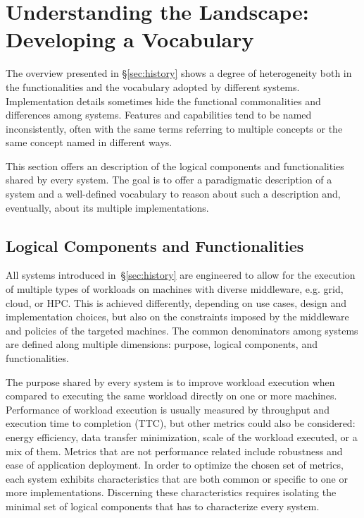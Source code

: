 \documentclass{sig-alternate}
\begin{document}
\section{Understanding the Landscape: Developing a Vocabulary}
\label{sec:understanding}

The overview presented in \S\ref{sec:history} shows a degree of heterogeneity
both in the functionalities and the vocabulary adopted by different \pilotjob
systems. Implementation details sometimes hide the functional commonalities and
differences among \pilotjob systems. Features and capabilities tend to be named
inconsistently, often with the same terms referring to multiple concepts or the
same concept named in different ways.

This section offers an description of the logical components and functionalities
shared by every \pilotjob system. The goal is to offer a paradigmatic
description of a \pilotjob system and a well-defined vocabulary to reason about
such a description and, eventually, about its multiple implementations.


\subsection{Logical Components and Functionalities}
\label{sec:compsandfuncs}

All \pilotjob systems introduced in~\S\ref{sec:history} are engineered to allow
for the execution of multiple types of workloads on machines with diverse
middleware, e.g. grid, cloud, or HPC. This is achieved differently, depending on
use cases, design and implementation choices, but also on the constraints
imposed by the middleware and policies of the targeted machines. The common
denominators among \pilotjob systems are defined along multiple dimensions:
purpose, logical components, and functionalities.

The purpose shared by every \pilotjob system is to improve workload execution
when compared to executing the same workload directly on one or more machines.
Performance of workload execution is usually measured by throughput and
execution time to completion (TTC), but other metrics could also be considered:
energy efficiency, data transfer minimization, scale of the workload executed,
or a mix of them. Metrics that are not performance related include robustness
and ease of application deployment. In order to optimize the chosen set of
metrics, each \pilotjob system exhibits characteristics that are both common or
specific to one or more implementations. Discerning these characteristics
requires isolating the minimal set of logical components that has to
characterize every \pilotjob system.
\end{document}
